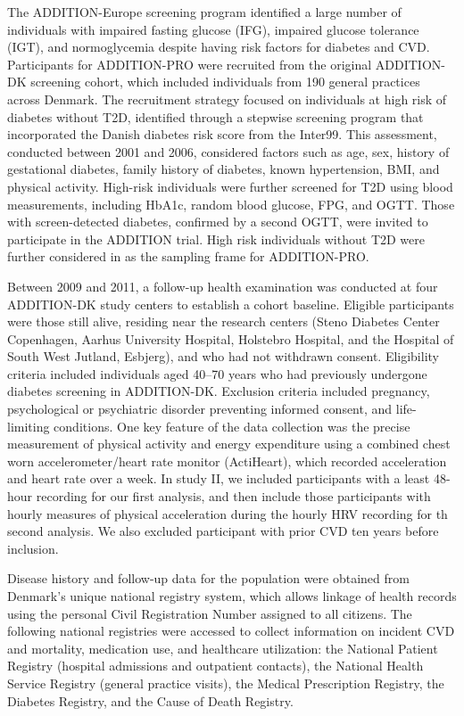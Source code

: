 \documentclass[
  a4paper,
  headsepline=true,
  open=any]{scrbook}
\begin{document}
The ADDITION-Europe screening program identified a large number of
individuals with impaired fasting glucose (IFG), impaired glucose
tolerance (IGT), and normoglycemia despite having risk factors for
diabetes and CVD. Participants for ADDITION-PRO were recruited from the
original ADDITION-DK screening cohort, which included individuals from
190 general practices across Denmark. The recruitment strategy focused
on individuals at high risk of diabetes without T2D, identified through
a stepwise screening program that incorporated the Danish diabetes risk
score from the Inter99. This assessment, conducted between 2001 and
2006, considered factors such as age, sex, history of gestational
diabetes, family history of diabetes, known hypertension, BMI, and
physical activity. High-risk individuals were further screened for T2D
using blood measurements, including HbA1c, random blood glucose, FPG,
and OGTT. Those with screen-detected diabetes, confirmed by a second
OGTT, were invited to participate in the ADDITION trial. High risk
individuals without T2D were further considered in as the sampling frame
for ADDITION-PRO.

Between 2009 and 2011, a follow-up health examination was conducted at
four ADDITION-DK study centers to establish a cohort baseline. Eligible
participants were those still alive, residing near the research centers
(Steno Diabetes Center Copenhagen, Aarhus University Hospital, Holstebro
Hospital, and the Hospital of South West Jutland, Esbjerg), and who had
not withdrawn consent. Eligibility criteria included individuals aged
40--70 years who had previously undergone diabetes screening in
ADDITION-DK. Exclusion criteria included pregnancy, psychological or
psychiatric disorder preventing informed consent, and life-limiting
conditions. One key feature of the data collection was the precise
measurement of physical activity and energy expenditure using a combined
chest worn accelerometer/heart rate monitor (ActiHeart), which recorded
acceleration and heart rate over a week. In study II, we included
participants with a least 48-hour recording for our first analysis, and
then include those participants with hourly measures of physical
acceleration during the hourly HRV recording for th second analysis. We
also excluded participant with prior CVD ten years before inclusion.

Disease history and follow-up data for the population were obtained from
Denmark's unique national registry system, which allows linkage of
health records using the personal Civil Registration Number assigned to
all citizens. The following national registries were accessed to collect
information on incident CVD and mortality, medication use, and
healthcare utilization: the National Patient Registry (hospital
admissions and outpatient contacts), the National Health Service
Registry (general practice visits), the Medical Prescription Registry,
the Diabetes Registry, and the Cause of Death Registry.
\end{document}
